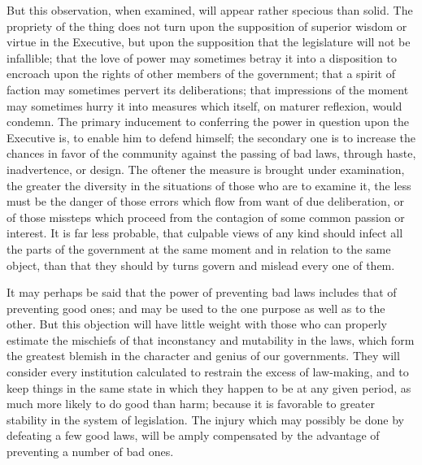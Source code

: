 But this observation, when examined, will appear rather specious than solid. The propriety of the thing does not turn upon the supposition of superior wisdom or virtue in the Executive, but upon the supposition that the legislature will not be infallible; that the love of power may sometimes betray it into a disposition to encroach upon the rights of other members of the government; that a spirit of faction may sometimes pervert its deliberations; that impressions of the moment may sometimes hurry it into measures which itself, on maturer reflexion, would condemn. The primary inducement to conferring the power in question upon the Executive is, to enable him to defend himself; the secondary one is to increase the chances in favor of the community against the passing of bad laws, through haste, inadvertence, or design. The oftener the measure is brought under examination, the greater the diversity in the situations of those who are to examine it, the less must be the danger of those errors which flow from want of due deliberation, or of those missteps which proceed from the contagion of some common passion or interest. It is far less probable, that culpable views of any kind should infect all the parts of the government at the same moment and in relation to the same object, than that they should by turns govern and mislead every one of them.

It may perhaps be said that the power of preventing bad laws includes that of preventing good ones; and may be used to the one purpose as well as to the other. But this objection will have little weight with those who can properly estimate the mischiefs of that inconstancy and mutability in the laws, which form the greatest blemish in the character and genius of our governments. They will consider every institution calculated to restrain the excess of law-making, and to keep things in the same state in which they happen to be at any given period, as much more likely to do good than harm; because it is favorable to greater stability in the system of legislation. The injury which may possibly be done by defeating a few good laws, will be amply compensated by the advantage of preventing a number of bad ones.

